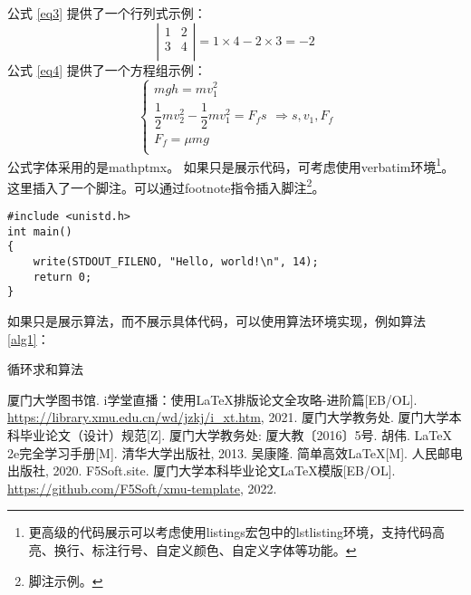 \documentclass{xmu}
\begin{document}
公式 \ref{eq3} 提供了一个行列式示例：
\begin{equation}\label{eq3}
    \left|\begin{array}{cc}
        1 & 2 \\
        3 & 4 \\
    \end{array}\right|=1\times4-2\times3=-2
\end{equation}
公式 \ref{eq4} 提供了一个方程组示例：
\begin{equation}\label{eq4}
    \begin{cases}
        mgh=mv_1^2                         \\
        \dfrac12mv_2^2-\dfrac12mv_1^2=F_fs \\
        F_f=\mu mg                         \\
    \end{cases} \Rightarrow s,v_1,F_f
\end{equation}
公式字体采用的是mathptmx。
如果只是展示代码，可考虑使用verbatim环境\footnote{更高级的代码展示可以考虑使用listings宏包中的lstlisting环境，支持代码高亮、换行、标注行号、自定义颜色、自定义字体等功能。}。
这里插入了一个脚注。可以通过footnote指令插入脚注\footnote{脚注示例。}。
\begin{verbatim}
#include <unistd.h>
int main()
{
    write(STDOUT_FILENO, "Hello, world!\n", 14);
    return 0;
}
\end{verbatim}
如果只是展示算法，而不展示具体代码，可以使用算法环境实现，例如算法 \ref{alg1}：
\begin{algorithm}[!htb]
    \caption{循环求和算法}\label{alg1}
\end{algorithm}


% 

\begin{thebibliography}{5}
     厦门大学图书馆. i学堂直播：使用LaTeX排版论文全攻略-进阶篇[EB/OL]. \url{https://library.xmu.edu.cn/wd/jzkj/i_xt.htm}, 2021.
     厦门大学教务处. 厦门大学本科毕业论文（设计）规范[Z]. 厦门大学教务处: 厦大教〔2016〕5号.
     胡伟. LaTeX 2e完全学习手册[M]. 清华大学出版社, 2013.
     吴康隆. 简单高效LaTeX[M]. 人民邮电出版社, 2020.
     F5Soft.site. 厦门大学本科毕业论文LaTeX模版[EB/OL]. \url{https://github.com/F5Soft/xmu-template}, 2022.
\end{thebibliography}
\end{document}
